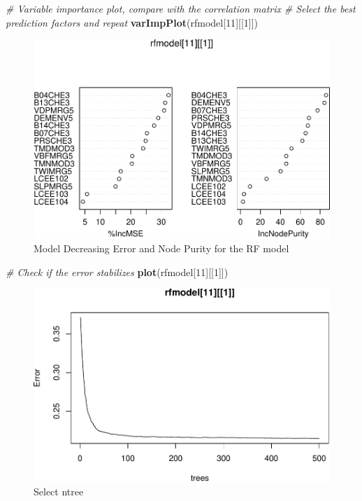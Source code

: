 \documentclass[10pt,b5paper,]{book}
\newenvironment{Shaded}{\begin{snugshade}}{\end{snugshade}}
\newcommand{\CommentTok}[1]{\textcolor[rgb]{0.56,0.35,0.01}{\textit{#1}}}
\newcommand{\DecValTok}[1]{\textcolor[rgb]{0.00,0.00,0.81}{#1}}
\newcommand{\KeywordTok}[1]{\textcolor[rgb]{0.13,0.29,0.53}{\textbf{#1}}}
\newcommand{\NormalTok}[1]{#1}
\theoremstyle{definition}
\theoremstyle{definition}
\theoremstyle{definition}
\theoremstyle{remark}
\begin{document}
\begin{Shaded}
\begin{Highlighting}[]
\CommentTok{# Variable importance plot, compare with the correlation matrix}
\CommentTok{# Select the best prediction factors and repeat  }
\KeywordTok{varImpPlot}\NormalTok{(rfmodel[}\DecValTok{11}\NormalTok{][[}\DecValTok{1}\NormalTok{]])}
\end{Highlighting}
\end{Shaded}

\begin{figure}
\centering
\includegraphics{SOCMapping_files/figure-latex/unnamed-chunk-59-1.pdf}
\caption{\label{fig:unnamed-chunk-59}Model Decreasing Error and Node Purity
for the RF model}
\end{figure}

\begin{Shaded}
\begin{Highlighting}[]
\CommentTok{# Check if the error stabilizes }
\KeywordTok{plot}\NormalTok{(rfmodel[}\DecValTok{11}\NormalTok{][[}\DecValTok{1}\NormalTok{]])}
\end{Highlighting}
\end{Shaded}

\begin{figure}
\centering
\includegraphics{SOCMapping_files/figure-latex/unnamed-chunk-60-1.pdf}
\caption{\label{fig:unnamed-chunk-60}Select ntree}
\end{figure}
\end{document}
